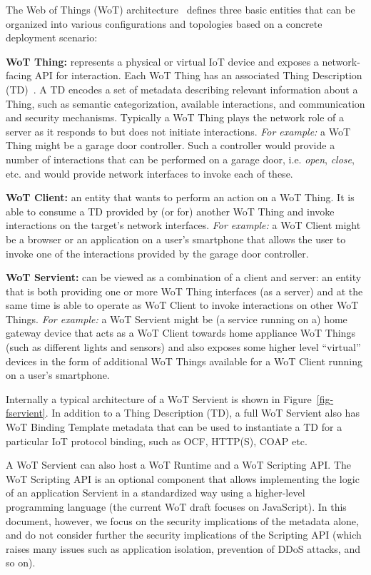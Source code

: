 The Web of Things (WoT) architecture~\cite{Wot2017arch} defines three basic entities
that can be organized into various configurations and topologies 
based on a concrete deployment scenario:

\noindent\textbf{WoT Thing:} represents a physical or virtual IoT device 
        and exposes a network-facing API for interaction.
	Each WoT Thing has an associated Thing Description (TD)~\cite{Wot2017td}. 
        A TD encodes a set of metadata describing relevant information about a Thing,
        such as semantic categorization, available interactions, and communication and security mechanisms.
        Typically a WoT Thing plays the network role of a server as it responds to
        but does not initiate interactions.
\emph{For example:} a WoT Thing might be a garage door controller.
Such a controller would provide a number of interactions that can be performed on a garage door, 
i.e. \textit{open}, \textit{close}, etc. and would provide network interfaces to invoke
each of these.

\noindent\textbf{WoT Client:} an entity that wants to perform an action on a WoT Thing.
It is able to consume a TD provided by (or for) another WoT Thing and invoke interactions on 
the target's network interfaces.
\emph{For example:} a WoT Client might be a browser or an application on a user's smartphone
that allows the user to invoke one of the interactions provided by the garage door controller. 

\noindent\textbf{WoT Servient:} can be viewed as a combination of a client and server:
        an entity that is both providing one or more WoT Thing interfaces (as a server) and
        at the same time is able to operate as WoT Client to invoke interactions on other WoT Things.
\emph{For example:} a WoT Servient might be (a service running on a) home gateway device 
that acts as a WoT Client towards home appliance WoT Things
(such as different lights and sensors) and also exposes some higher level ``virtual'' devices 
in the form of additional WoT Things available for a WoT Client running on a user's smartphone.

Internally a typical architecture of a WoT Servient is shown in Figure~\ref{fig-fservient}. 
In addition to a Thing Description (TD), a full WoT Servient also has WoT Binding Template 
metadata that can be used to instantiate a TD for a particular IoT protocol binding, 
such as OCF, HTTP(S), COAP etc. 

A WoT Servient can also host a WoT Runtime and a WoT Scripting API.
The WoT Scripting API is an optional component that allows 
implementing the logic of an application Servient in a standardized way
using a higher-level programming language (the current WoT draft focuses on JavaScript). 
In this document, however, we focus on the security implications of the metadata alone,
and do not consider further the security implications of the Scripting API (which
raises many issues such as application isolation, prevention of DDoS attacks, and so on).

